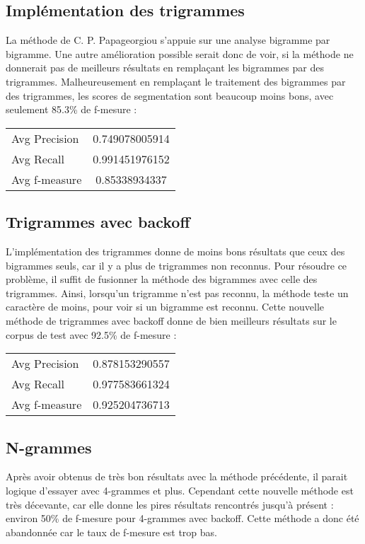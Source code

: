
\subsection{Implémentation des trigrammes}

La méthode de C. P. Papageorgiou s'appuie sur une analyse bigramme par bigramme. Une autre amélioration possible serait donc de voir, si la méthode ne donnerait pas de meilleurs résultats en remplaçant les bigrammes par des trigrammes. Malheureusement en remplaçant le traitement des bigrammes par des trigrammes, les scores de segmentation sont beaucoup moins bons, avec seulement 85.3\% de f-mesure :
\begin{center}
	\begin{tabular}{|l c|}
	  	\hline
	  	Avg Precision & 0.749078005914 \\
		Avg Recall & 0.991451976152 \\
		Avg f-measure & 0.85338934337 \\
	  	\hline
	\end{tabular}
\end{center}


\subsection{Trigrammes avec backoff}

L'implémentation des trigrammes donne de moins bons résultats que ceux des bigrammes seuls, car il y a plus de trigrammes non reconnus. Pour résoudre ce problème, il suffit de fusionner la méthode des bigrammes avec celle des trigrammes. Ainsi, lorsqu'un trigramme n'est pas reconnu, la méthode teste un caractère de moins, pour voir si un bigramme est reconnu. Cette nouvelle méthode de trigrammes avec backoff donne de bien meilleurs résultats sur le corpus de test avec 92.5\% de f-mesure :
\begin{center}
	\begin{tabular}{|l c|}
	  	\hline
	  	Avg Precision & 0.878153290557 \\
		Avg Recall & 0.977583661324 \\
		Avg f-measure & 0.925204736713 \\
	  	\hline
	\end{tabular}
\end{center}


\subsection{N-grammes}

Après avoir obtenus de très bon résultats avec la méthode précédente, il parait logique d'essayer avec 4-grammes et plus. Cependant cette nouvelle méthode est très décevante, car elle donne les pires résultats rencontrés jusqu'à présent : environ 50\% de f-mesure pour 4-grammes avec backoff. Cette méthode a donc été abandonnée car le taux de f-mesure est trop bas.
